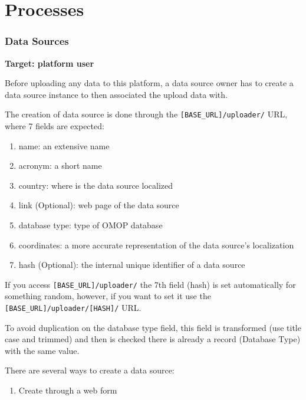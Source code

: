 \documentclass[
]{book}
\providecommand{\tightlist}{%
  \setlength{\itemsep}{0pt}\setlength{\parskip}{0pt}}
\begin{document}
\hypertarget{processes}{%
\chapter{Processes}\label{processes}}

\hypertarget{data-sources}{%
\subsection*{Data Sources}\label{data-sources}}

\textbf{Target: platform user}

Before uploading any data to this platform, a data source owner has to create a data source instance to then associated the upload data with.

The creation of data source is done through the \texttt{{[}BASE\_URL{]}/uploader/} URL, where 7 fields are expected:

\begin{enumerate}
\def\labelenumi{\arabic{enumi}.}
\tightlist
\item
  name: an extensive name
\item
  acronym: a short name
\item
  country: where is the data source localized
\item
  link (Optional): web page of the data source
\item
  database type: type of OMOP database
\item
  coordinates: a more accurate representation of the data source's localization
\item
  hash (Optional): the internal unique identifier of a data source
\end{enumerate}

If you access \texttt{{[}BASE\_URL{]}/uploader/} the 7th field (hash) is set automatically for something random, however, if you want to set it use the \texttt{{[}BASE\_URL{]}/uploader/{[}HASH{]}/} URL.

To avoid duplication on the database type field, this field is transformed (use title case and trimmed) and then is checked there is already a record (Database Type) with the same value.

There are several ways to create a data source:

\begin{enumerate}
\def\labelenumi{\arabic{enumi}.}
\tightlist
\item
  Create through a web form
\end{enumerate}
\end{document}
